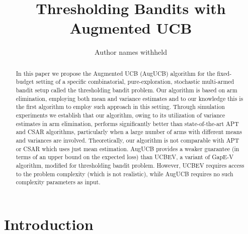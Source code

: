 \documentclass{article}
\title{Thresholding Bandits with Augmented UCB}
\author{Author names withheld}
\begin{document}
\maketitle

\begin{abstract}
In this paper we propose the Augmented UCB (AugUCB) algorithm for the fixed-budget setting of a specific combinatorial, pure-exploration, stochastic multi-armed bandit setup called the thresholding bandit problem. Our algorithm is based on arm elimination, employing both mean and variance estimates and to our knowledge this is the first algorithm to employ such approach in this setting. Through simulation experiments we establish that our algorithm, owing to its utilization of variance estimates in arm elimination, performs significantly better than state-of-the-art APT and CSAR algorithms, particularly when a large number of arms with different means and variances are involved. Theoretically, our algorithm is not comparable with APT or CSAR which uses just mean estimation. AugUCB provides a weaker guarantee (in terms of an upper bound on the expected loss) than UCBEV, a variant of GapE-V \cite{gabillon2011multi} algorithm, modified for thresholding bandit problem. However, UCBEV requires access to the problem complexity (which is not realistic), while AugUCB requires no such complexity parameters as input. 

\end{abstract}


\section{Introduction}
\label{intro}


\end{document}
